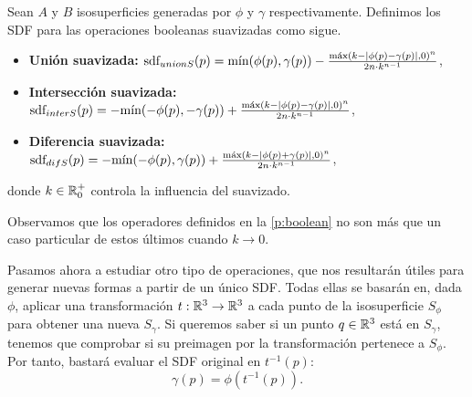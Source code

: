 
\begin{definicion}
    Sean $A$ y $B$ isosuperficies generadas por $\phi$ y $\gamma$ respectivamente. Definimos los SDF para las operaciones booleanas suavizadas como sigue.
    \begin{itemize}
        \item \textbf{Unión suavizada: } $\sdf_{unionS}(p) = \Min(\phi(p),\gamma(p)) - \frac{\Max\left( k - |\phi(p) - \gamma(p)|, 0\right)^n}{2n\cdot k^{n-1}}$,
        \item \textbf{Intersección suavizada: } $\sdf_{interS}(p) = -\Min(-\phi(p),-\gamma(p)) + \frac{\Max\left( k - |\phi(p) - \gamma(p)|, 0\right)^n}{2n\cdot k^{n-1}}$,
        \item \textbf{Diferencia suavizada: } $\sdf_{difS}(p) = -\Min(-\phi(p),\gamma(p)) + \frac{\Max\left( k - |\phi(p) + \gamma(p)|, 0\right)^n}{2n\cdot k^{n-1}}$,
    \end{itemize}

    donde $k\in \R^+_0$ controla la influencia del suavizado.        
\end{definicion}

Observamos que los operadores definidos en la \autoref{p:boolean} no son más que un caso particular de estos últimos cuando $k\to 0$.\newline



Pasamos ahora a estudiar otro tipo de operaciones, que nos resultarán útiles para generar nuevas formas a partir de un único SDF. Todas ellas se basarán en, dada $\phi$, aplicar una transformación $t:\R^3\to \R^3$ a cada punto de la isosuperficie $S_{\phi}$ para obtener una nueva $S_{\gamma}$. Si queremos saber si un punto $q\in\R^3$ está en $S_{\gamma}$, tenemos que comprobar si su preimagen por la transformación pertenece a $S_{\phi}$. Por tanto, bastará evaluar el SDF original en $t^{-1}(p)$:
\begin{equation*}
    \gamma(p) = \phi(t^{-1}(p)).
\end{equation*}

